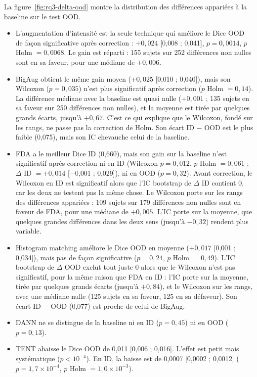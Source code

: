 La figure~\ref{fig:rq3-delta-ood} montre la distribution des différences appariées à la baseline sur le test OOD.
\begin{itemize}
  \item L'augmentation d'intensité est la seule technique qui améliore le Dice OOD de façon significative après correction : $+0{,}024$ [0,008 ; 0,041], $p = 0{,}0014$, $p$ Holm $= 0{,}0068$. Le gain est réparti : 155 sujets sur 252 différences non nulles sont en sa faveur, pour une médiane de $+0{,}006$.
  \item BigAug obtient le même gain moyen ($+0{,}025$ [0,010 ; 0,040]), mais son Wilcoxon ($p = 0{,}035$) n'est plus significatif après correction ($p$ Holm $= 0{,}14$). La différence médiane avec la baseline est quasi nulle ($+0{,}001$ ; 135 sujets en sa faveur sur 250 différences non nulles), et la moyenne est tirée par quelques grands écarts, jusqu'à $+0{,}67$. C'est ce qui explique que le Wilcoxon, fondé sur les rangs, ne passe pas la correction de Holm. Son écart ID $-$ OOD est le plus faible (0,075), mais son IC chevauche celui de la baseline.
  \item FDA a le meilleur Dice ID (0,660), mais son gain sur la baseline n'est significatif après correction ni en ID (Wilcoxon $p = 0{,}012$, $p$ Holm $= 0{,}061$ ; $\Delta$ ID $= +0{,}014$ [$-$0,001 ; 0,029]), ni en OOD ($p = 0{,}32$).
  Avant correction, le Wilcoxon en ID est significatif alors que l'IC bootstrap de $\Delta$ ID contient 0, car les deux ne testent pas la même chose.
  Le Wilcoxon porte sur les rangs des différences appariées : 109 sujets sur 179 différences non nulles sont en faveur de FDA, pour une médiane de $+0{,}005$.
  L'IC porte sur la moyenne, que quelques grandes différences dans les deux sens (jusqu'à $-0{,}32$) rendent plus variable.
  \item Histogram matching améliore le Dice OOD en moyenne ($+0{,}017$ [0,001 ; 0,034]), mais pas de façon significative ($p = 0{,}24$, $p$ Holm $= 0{,}49$). L'IC bootstrap de $\Delta$ OOD exclut tout juste 0 alors que le Wilcoxon n'est pas significatif, pour la même raison que FDA en ID : l'IC porte sur la moyenne, tirée par quelques grands écarts (jusqu'à $+0{,}84$), et le Wilcoxon sur les rangs, avec une médiane nulle (125 sujets en sa faveur, 125 en sa défaveur). Son écart ID $-$ OOD (0,077) est proche de celui de BigAug.
  \item DANN ne se distingue de la baseline ni en ID ($p = 0{,}45$) ni en OOD ($p = 0{,}13$).
  \item TENT abaisse le Dice OOD de 0,011 [0,006 ; 0,016]. L'effet est petit mais systématique ($p < 10^{-4}$). En ID, la baisse est de 0,0007 [0,0002 ; 0,0012] ($p = 1{,}7 \times 10^{-4}$, $p$ Holm $= 1{,}0 \times 10^{-3}$).
\end{itemize}


